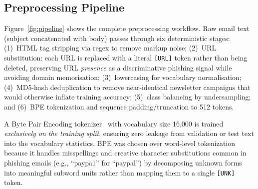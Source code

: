 \documentclass[sigconf, nonacm]{acmart}
\begin{document}
\subsection{Preprocessing Pipeline}

Figure~\ref{fig:pipeline} shows the complete preprocessing workflow.
Raw email text (subject concatenated with body) passes through
six deterministic stages: (1)~HTML tag stripping via regex to remove
markup noise; (2)~URL substitution: each URL is replaced with a literal
\texttt{[URL]} token rather than being deleted, preserving URL
\emph{presence} as a discriminative phishing signal while avoiding
domain memorisation; (3)~lowercasing for vocabulary
normalisation; (4)~MD5-hash deduplication to remove near-identical
newsletter campaigns that would otherwise inflate training accuracy;
(5)~class balancing by undersampling; and (6)~BPE tokenization and
sequence padding/truncation to 512 tokens.

A Byte Pair Encoding tokenizer~\cite{sennrich2016} with vocabulary
size 16{,}000 is trained \emph{exclusively on the training split},
ensuring zero leakage from validation or test text into the vocabulary
statistics.
BPE was chosen over word-level tokenization because it handles
misspellings and creative character substitutions common in phishing
emails (e.g., ``paypa1'' for ``paypal'') by decomposing unknown
forms into meaningful subword units rather than mapping them to a
single \texttt{[UNK]} token.
\end{document}
